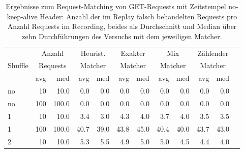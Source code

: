 \documentclass[12pt,a4paper]{report}
\begin{document}
\begin{table}[H]
	\centering
	\caption[Ergebnisse zum Request-Matching von GET-Requests mit Zeitstempel no-keep-alive Header]{
		Ergebnisse zum Request-Matching von GET-Requests mit Zeitstempel no-keep-alive Header:
		Anzahl der im Replay falsch behandelten Requests pro Anzahl Requests im Recording,
		beides als Durchschnitt und Median über zehn Durchführungen des Versuchs mit dem jeweiligen Matcher.
	}
	\label{tab:get_ts_nka}
	\begin{tabular}{|l|r|r|r|r|r|r|r|r|r|r|r|}
		\hline
		\multirow{3}{*}{Shuffle} & \multicolumn{2}{|c|}{Anzahl}   & \multicolumn{2}{|c|}{Heurist.} & \multicolumn{2}{|c|}{Exakter} & \multicolumn{2}{|c|}{Mix}     & \multicolumn{2}{|c|}{Zählender}                                    \\
		                         & \multicolumn{2}{|c|}{Requests} & \multicolumn{2}{|c|}{Matcher}  & \multicolumn{2}{|c|}{Matcher} & \multicolumn{2}{|c|}{Matcher} & \multicolumn{2}{|c|}{Matcher}                                      \\ \cline{2-11}
		                         & avg                            & med                            & avg                           & med                           & avg                             & med  & avg  & med  & avg  & med  \\ \hline
		no                       & 10                             & 10.0                           & 0.0                           & 0.0                           & 0.0                             & 0.0  & 0.0  & 0.0  & 0.0  & 0.0  \\ \hline
		no                       & 100                            & 100.0                          & 0.0                           & 0.0                           & 0.0                             & 0.0  & 0.0  & 0.0  & 0.0  & 0.0  \\ \hline
		1                        & 10                             & 10.0                           & 3.4                           & 3.0                           & 4.3                             & 4.0  & 3.7  & 4.0  & 3.5  & 3.5  \\ \hline
		1                        & 100                            & 100.0                          & 40.7                          & 39.0                          & 43.8                            & 45.0 & 40.4 & 40.0 & 43.7 & 43.0 \\ \hline
		2                        & 10                             & 10.0                           & 5.3                           & 5.5                           & 4.9                             & 5.0  & 5.0  & 4.5  & 4.4  & 4.0  \\ \hline

\end{tabular}
\end{table}
\end{document}
